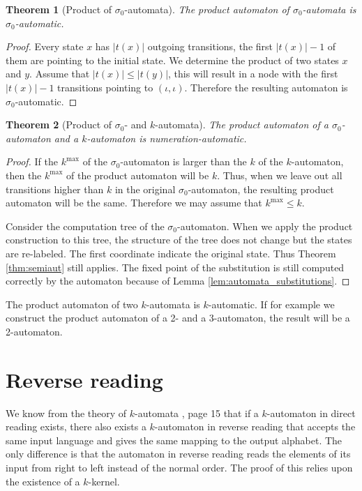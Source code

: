 \documentclass{article}
\newtheorem{theorem}{Theorem}[subsection]
\theoremstyle{definition}
\begin{document}
\begin{theorem}[Product of $\sigma_0$-automata]
The product automaton of $\sigma_0$-automata is $\sigma_0$-automatic.
\end{theorem}
\begin{proof}
Every state $x$ has $|t(x)|$ outgoing transitions, the first $|t(x)| - 1$ of 
them are pointing to the initial state. We determine the product of two states 
$x$ and $y$. Assume that $|t(x)| \le |t(y)|$, this will result in a node with 
the first $|t(x)| - 1$ transitions pointing to $(\iota, \iota)$. Therefore
the resulting automaton is $\sigma_0$-automatic.
\end{proof}

\begin{theorem}[Product of $\sigma_0$- and $k$-automata]
The product automaton of a $\sigma_0$-automaton and a $k$-automaton is
numeration-automatic.
\end{theorem}
\begin{proof}
If the $k^{\mathrm{max}}$ of the $\sigma_0$-automaton is larger than the $k$ of
the $k$-automaton, then the $k^{\mathrm{max}}$ of the product automaton will
be $k$. Thus, when we leave out all transitions higher than $k$ in the
original $\sigma_0$-automaton, the resulting product automaton will be the 
same. Therefore we may assume that $k^{\mathrm{max}} \le k$. 

Consider the computation tree of the $\sigma_0$-automaton. When we apply the 
product construction to this tree, the structure of the tree does not change 
but the states are re-labeled. The first coordinate indicate the original
state. Thus Theorem \ref{thm:semiaut} still applies. The fixed point of the 
substitution is still computed correctly by the automaton because of Lemma 
\ref{lem:automata_substitutions}.
\end{proof}

The product automaton of two $k$-automata is $k$-automatic. If for example 
we construct the product automaton of a 2- and a 3-automaton, the result will
be a 2-automaton.

\section{Reverse reading}
We know from the theory of $k$-automata \cite{Fogg}, page 15 that if a 
$k$-automaton in direct reading exists, there also exists a $k$-automaton in 
reverse reading that accepts the same input language and gives the same 
mapping to the output alphabet. The only difference is that the automaton in
reverse reading reads the elements of its input from right to left instead of 
the normal order. The proof of this relies upon the existence of a $k$-kernel.
\end{document}

